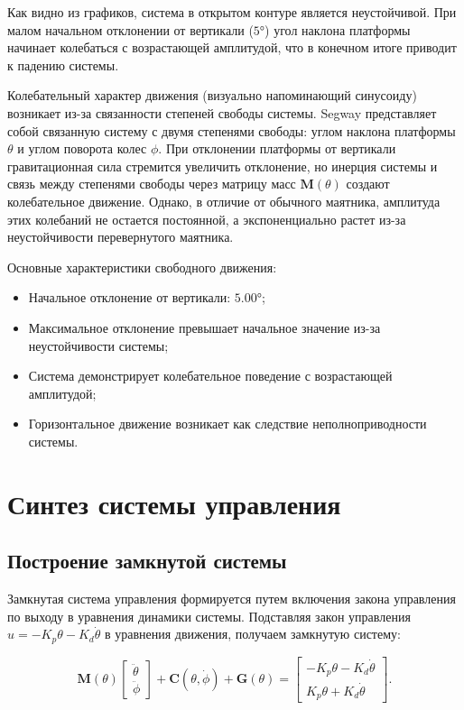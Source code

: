 Как видно из графиков, система в открытом контуре является неустойчивой. При малом начальном отклонении от вертикали ($5°$) угол наклона платформы начинает колебаться с возрастающей амплитудой, что в конечном итоге приводит к падению системы.

Колебательный характер движения (визуально напоминающий синусоиду) возникает из-за связанности степеней свободы системы. Segway представляет собой связанную систему с двумя степенями свободы: углом наклона платформы $\theta$ и углом поворота колес $\phi$. При отклонении платформы от вертикали гравитационная сила стремится увеличить отклонение, но инерция системы и связь между степенями свободы через матрицу масс $\mathbf{M}(\theta)$ создают колебательное движение. Однако, в отличие от обычного маятника, амплитуда этих колебаний не остается постоянной, а экспоненциально растет из-за неустойчивости перевернутого маятника.

Основные характеристики свободного движения:
\begin{itemize}
    \item Начальное отклонение от вертикали: $5.00°$;
    \item Максимальное отклонение превышает начальное значение из-за неустойчивости системы;
    \item Система демонстрирует колебательное поведение с возрастающей амплитудой;
    \item Горизонтальное движение возникает как следствие неполноприводности системы.
\end{itemize}

\section{Синтез системы управления}

\subsection{Построение замкнутой системы}

Замкнутая система управления формируется путем включения закона управления по выходу в уравнения динамики системы. Подставляя закон управления $u = -K_p \theta - K_d \dot{\theta}$ в уравнения движения, получаем замкнутую систему:

\[
\mathbf{M}(\theta) \begin{bmatrix} \ddot{\theta} \\ \ddot{\phi} \end{bmatrix} + \mathbf{C}(\theta, \dot{\phi}) + \mathbf{G}(\theta) = \begin{bmatrix} -K_p \theta - K_d \dot{\theta} \\ K_p \theta + K_d \dot{\theta} \end{bmatrix}.
\]

